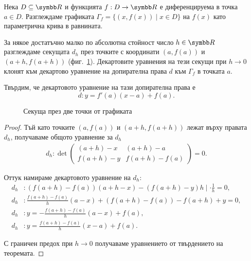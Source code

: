 \documentclass[numbers=endperiod, bibliography=totocnumbered]{scrartcl}
\begin{document}
\bigskip
\begin{minipage}{0.45\textwidth}
  \begin{theorem}
    Нека \( D \subseteq \R \) и функцията \( f: D \to \R \) е диференцируема в точка \( a \in D \). Разглеждаме графиката \( \Gamma_f = \{ (x, f(x)) \mid x \in D \} \) на \( f(x) \) като параметрична крива в равнината.

    За някое достатъчно малко по абсолютна стойност число \( h \in \R \) разглеждаме секущата \( d_h \) през точките с координати \( (a, f(a)) \) и \( (a+h, f(a+h)) \) (фиг.~\ref{fig:secant}). Декартовите уравнения на тези секущи при \( h \to 0 \) клонят към декартово уравнение на допирателна права \( d \) към \( \Gamma_f \) в точката \( a \).

    Твърдим, че декартовото уравнение на тази допирателна права е
    \begin{equation*}
      d: y = f'(a) (x-a) + f(a).
    \end{equation*}
  \end{theorem}
\end{minipage}
\hspace{0.5cm}
\begin{minipage}{0.45\textwidth}
  \begin{figure}[H]\label{fig:secant}
    \centering
    \caption{Секуща през две точки от графиката}
  \end{figure}
\end{minipage}
\begin{proof}
  Тъй като точките \( (a, f(a)) \) и \( (a+h, f(a+h)) \) лежат върху правата \( d_h \), получаваме общото уравнение за \( d_h \)
    \begin{align*}
      d_h: \det \begin{pmatrix}
      (a+h)-x & (a+h)-a \\
      f(a+h)-y & f(a+h)-f(a)
    \end{pmatrix}
    = 0.
  \end{align*}

  Оттук намираме декартовото уравнение на \( d_h \):
  \begin{align*}
    d_h&: (f(a+h) - f(a)) (a+h-x) - (f(a+h)-y)h \mid \cdot \frac 1 h = 0,
    \\
    d_h&: \frac {f(a+h) - f(a)} h (a-x) + (f(a+h) - f(a)) - f(a+h) + y = 0,
    \\
    d_h&: y = -\frac {f(a+h) - f(a)} h (a-x) + f(a),
    \\
    d_h&: y = \frac {f(a+h) - f(a)} h (x-a) + f(a).
  \end{align*}

  С граничен предох при \( h \to 0 \) получаваме уравнението от твърдението на теоремата.
\end{proof}
\end{document}
